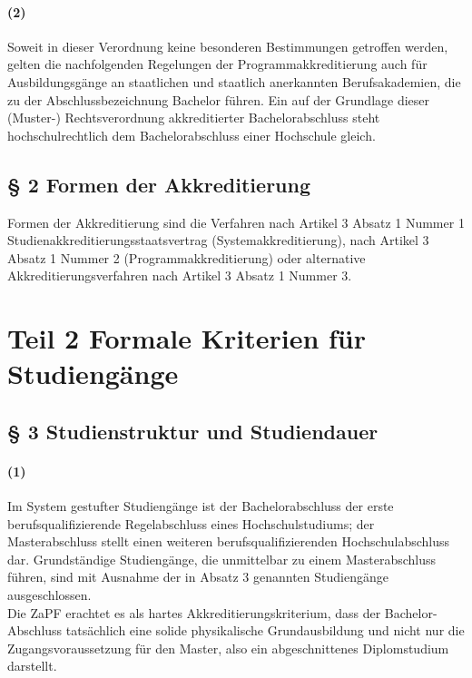 \documentclass[a4paper]{scrartcl}
\begin{document}
\paragraph{(2)} Soweit in dieser Verordnung keine besonderen Bestimmungen getroffen werden, gelten die nachfolgenden Regelungen der Programmakkreditierung auch für Ausbildungsgänge an staatlichen und staatlich anerkannten Berufsakademien, die zu der Abschlussbezeichnung Bachelor führen. Ein auf der Grundlage dieser (Muster-) Rechtsverordnung akkreditierter Bachelorabschluss steht hochschulrechtlich dem Bachelorabschluss einer Hochschule gleich.
\subsection{§ 2 Formen der Akkreditierung}
Formen der Akkreditierung sind die Verfahren nach Artikel 3 Absatz 1 Nummer 1 Studienakkreditierungsstaatsvertrag (Systemakkreditierung), nach Artikel 3 Absatz 1 Nummer 2 (Programmakkreditierung) oder alternative Akkreditierungsverfahren nach Artikel 3 Absatz 1 Nummer 3.

\section{Teil 2 Formale Kriterien für Studiengänge}
\subsection{§ 3 Studienstruktur und Studiendauer}
\paragraph{(1)} Im System gestufter Studiengänge ist der Bachelorabschluss der erste berufsqualifizierende Regelabschluss eines Hochschulstudiums; der Masterabschluss stellt einen weiteren berufsqualifizierenden Hochschulabschluss dar. Grundständige Studiengänge, die unmittelbar zu einem Masterabschluss führen, sind mit Ausnahme der in Absatz 3 genannten Studiengänge ausgeschlossen.\\

\textcolor{Bernd}{\textbf{\cite{RESO: SoSe2002-RL}} Die ZaPF erachtet es als hartes Akkreditierungskriterium, dass der Bachelor-Abschluss tatsächlich eine solide physikalische Grundausbildung und nicht nur die Zugangsvoraussetzung für den Master, also ein abgeschnittenes Diplomstudium darstellt.}\\
\end{document}
